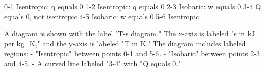 0-1 Isentropic: q equals 0  
1-2 Isentropic: q equals 0  
2-3 Isobaric: w equals 0  
3-4 Q equals 0, not isentropic  
4-5 Isobaric: w equals 0  
5-6 Isentropic  

A diagram is shown with the label "T-s diagram."  
The x-axis is labeled "s in kJ per kg·K," and the y-axis is labeled "T in K."  
The diagram includes labeled regions:  
- "Isentropic" between points 0-1 and 5-6.  
- "Isobaric" between points 2-3 and 4-5.  
- A curved line labeled "3-4" with "Q equals 0."